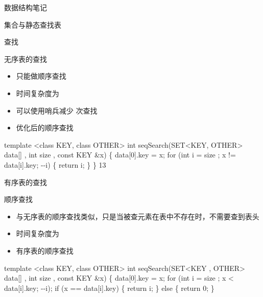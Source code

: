 \documentclass[
  ignorenonframetext,
]{beamer}
\newenvironment{Shaded}{}{}
\newcommand{\NormalTok}[1]{#1}
\begin{document}
\begin{frame}[fragile]{数据结构笔记}
\begin{block}{集合与静态查找表}
\begin{block}{查找}
\begin{block}{无序表的查找}
\protect{}\label{ux65e0ux5e8fux8868ux7684ux67e5ux627e}
\begin{itemize}
\item
  只能做顺序查找
\item
  时间复杂度为 {}
\item
  可以使用哨兵减少 {} 次查找
\item
  优化后的顺序查找
\end{itemize}

\begin{Shaded}
\begin{Highlighting}[]
\NormalTok{template \textless{}class KEY, class OTHER\textgreater{}}
\NormalTok{int seqSearch(SET\textless{}KEY, OTHER\textgreater{} data[] , int size , const KEY \&x)}
\NormalTok{\{}
\NormalTok{  data[0].key = x;}
\NormalTok{  for (int i = size ; x != data[i].key; {-}{-}i)}
\NormalTok{  \{}
\NormalTok{    return i;}
\NormalTok{  \}}
\NormalTok{\}}
\NormalTok{13}
\end{Highlighting}
\end{Shaded}
\end{block}

\begin{block}{有序表的查找}
\protect{}\label{ux6709ux5e8fux8868ux7684ux67e5ux627e}
\begin{block}{顺序查找}
\protect{}\label{ux987aux5e8fux67e5ux627e}
\begin{itemize}
\item
  与无序表的顺序查找类似，只是当被查元素在表中不存在时，不需要查到表头
\item
  时间复杂度为 {}
\item
  有序表的顺序查找
\end{itemize}

\begin{Shaded}
\begin{Highlighting}[]
\NormalTok{template \textless{}class KEY, class OTHER\textgreater{}}
\NormalTok{int seqSearch(SET\textless{}KEY , OTHER\textgreater{} data[] , int size , const KEY \&x)}
\NormalTok{\{}
\NormalTok{  data[0].key = x;}
\NormalTok{  for (int i = size ; x \textless{} data[i].key; {-}{-}i);}
\NormalTok{  if (x == data[i].key)}
\NormalTok{  \{}
\NormalTok{    return i;}
\NormalTok{  \}}
\NormalTok{else}
\NormalTok{\{}
\NormalTok{  return 0;}
\NormalTok{\}}
\end{Highlighting}
\end{Shaded}
\end{block}


\end{block}
\end{block}
\end{block}
\end{frame}
\end{document}
